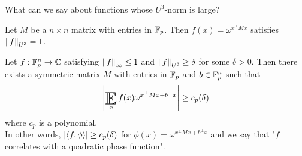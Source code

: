 \documentclass{article}
\begin{document}
What can we say about functions whose $U^3$-norm is large?

\begin{eg}
  Let $M$ be a $n \times n$ matrix with entries in $\mathbb F_p$. Then $f(x) = \omega^{x^\perp M x}$ satisfies $\left\lVert f\right\rVert_{U^3} = 1$.
\end{eg}

\begin{thm}
  Let $f : \mathbb F_p^n \to \mathbb C$ satisfying $\left\lVert f\right\rVert_\infty \le 1$ and $\left\lVert f\right\rVert_{U^3} \ge \delta$ for some $\delta > 0$. Then there exists a symmetric matrix $M$ with entries in $\mathbb F_p$ and $b \in \mathbb F_p^n$ such that
  $$\abs{\E_x f(x) \omega^{x^\perp M x + b^\perp x}} \ge c_p(\delta)$$
  where $c_p$ is a polynomial. \\
  In other words, $\left\lvert \langle f, \phi\rangle\right\rvert \ge c_p(\delta)$ for $\phi(x) = \omega^{x^\perp M x + b^\perp x}$ and we say that "$f$ correlates with a quadratic phase function".
\end{thm}
\end{document}
